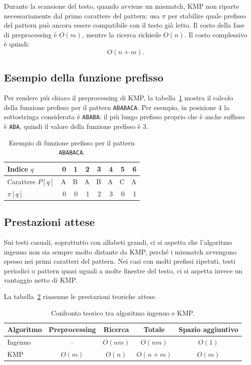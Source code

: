 \documentclass{article}
\begin{document}
Durante la scansione del testo, quando avviene un mismatch, KMP non riparte necessariamente dal primo carattere del pattern: usa $\pi$ per stabilire quale prefisso del pattern può ancora essere compatibile con il testo già letto. Il costo della fase di preprocessing è $O(m)$, mentre la ricerca richiede $O(n)$. Il costo complessivo è quindi:
\[
    O(n + m).
\]

\subsection{Esempio della funzione prefisso}
Per rendere più chiaro il preprocessing di KMP, la tabella~\ref{tab:prefisso} mostra il calcolo della funzione prefisso per il pattern \texttt{ABABACA}. Per esempio, in posizione 4 la sottostringa considerata è \texttt{ABABA}: il più lungo prefisso proprio che è anche suffisso è \texttt{ABA}, quindi il valore della funzione prefisso è 3.

\begin{table}[H]
\centering
\begin{tabular}{lrrrrrrr}
\toprule
Indice $q$ & 0 & 1 & 2 & 3 & 4 & 5 & 6 \\
\midrule
Carattere $P[q]$ & A & B & A & B & A & C & A \\
$\pi[q]$ & 0 & 0 & 1 & 2 & 3 & 0 & 1 \\
\bottomrule
\end{tabular}
\caption{Esempio di funzione prefisso per il pattern \texttt{ABABACA}.}
\label{tab:prefisso}
\end{table}

\subsection{Prestazioni attese}
Sui testi casuali, soprattutto con alfabeti grandi, ci si aspetta che l'algoritmo ingenuo non sia sempre molto distante da KMP, perché i mismatch avvengono spesso nei primi caratteri del pattern. Nei casi con molti prefissi ripetuti, testi periodici o pattern quasi uguali a molte finestre del testo, ci si aspetta invece un vantaggio netto di KMP.

La tabella~\ref{tab:complessita} riassume le prestazioni teoriche attese.

\begin{table}[H]
\centering
\begin{tabular}{lcccc}
\toprule
Algoritmo & Preprocessing & Ricerca & Totale & Spazio aggiuntivo \\
\midrule
Ingenuo & -- & $O(nm)$ & $O(nm)$ & $O(1)$ \\
KMP & $O(m)$ & $O(n)$ & $O(n+m)$ & $O(m)$ \\
\bottomrule
\end{tabular}
\caption{Confronto teorico tra algoritmo ingenuo e KMP.}
\label{tab:complessita}
\end{table}
\end{document}
